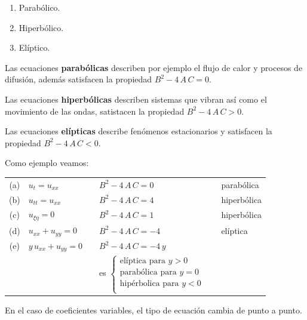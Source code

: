 \begin{enumerate}
\begin{enumerate}[label=(\alph*)]
\item Parabólico.
\item Hiperbólico.
\item Elíptico.
\end{enumerate}
Las ecuaciones \textbf{parabólicas} describen por ejemplo el flujo de calor y procesos de difusión, además satisfacen la propiedad $B^{2} - 4 \, A \, C = 0$.
\par
Las ecuaciones \textbf{hiperbólicas} describen sistemas que vibran así como el movimiento de las ondas, satistacen la propiedad $B^{2} - 4 \, A \, C > 0$.
\par
Las ecuaciones \textbf{elípticas} describe fenómenos estacionarios y satisfacen la propiedad $B^{2} - 4 \, A \, C < 0$.
\par
Como ejemplo veamos:
\begin{table}[H]
\centering
\large
\begin{tabular}{c l l l l l}
(a) & \Large{$u_{t} = u_{xx}$} & & \large{$B^{2} - 4 \, A \, C = 0$} & & parabólica \\
(b) & \Large{$u_{tt} = u_{xx}$} & & \large{$B^{2} - 4 \, A \, C = 4$} & & hiperbólica \\
(c) & \Large{$u_{\xi \eta} = 0$} & & \large{$B^{2} - 4 \, A \, C = 1$} & & hiperbólica \\
(d) & \Large{$u_{xx} + u_{yy} = 0$} & & \large{$B^{2} - 4 \, A \, C = -4$} & & elíptica \\
(e) & \Large{$y \, u_{xx} + u_{yy} = 0$} & & \large{$B^{2} - 4 \, A \, C = - 4 \, y$} & & \\
 & & & es $\begin{cases}
    \mbox{elíptica para } y > 0 \\
    \mbox{parabólica para } y = 0 \\
    \mbox{hipérbolica para } y < 0 \\
    \end{cases}$ &
\end{tabular}
\end{table}
En el caso de coeficientes variables, el tipo de ecuación cambia de punto a punto.
\end{enumerate}

